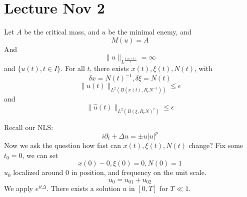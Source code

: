 \section{Lecture Nov 2}
Let $A$ be the critical mass, and $u$ be the minimal enemy, and 
\begin{equation*}
    M(u)=A
\end{equation*}
And
\begin{equation*}
    \|u\|_{L^\frac{2(n+2)}{n}}=\infty
\end{equation*}
and $\{u(t),t\in I\}$.
For all $t$, there exists $x(t), \xi(t), N(t)$, with
\begin{equation*}
    \delta x=N(t)^{-1}, \delta\xi=N(t)
\end{equation*}
\begin{equation*}
    \|u(t)\|_{L^2(B(x(t), R_\epsilon N^{-1}))}\leq\epsilon
\end{equation*}
and 
\begin{equation*}
    \|\hat{u}(t)\|_{L^2(B(\xi, R_cN)^c)}\leq\epsilon
\end{equation*}

Recall our NLS:
\begin{equation*}
    i\partial_t+\Delta u=\pm u|u|^p
\end{equation*}
Now we ask the question how fast can $x(t), \xi(t), N(t)$ change? Fix some $t_0=0$, we can set 
\begin{equation*}
    x(0)-0, \xi(0)=0, N(0)=1
\end{equation*}
$u_0$ localized around 0 in position, and frequency on the unit scale.
\begin{equation*}
    u_0=u_{01}+u_{02}
\end{equation*}
We apply $e^{it\Delta}$. There exists a solution $u$ in $[0,T]$ for $T\ll 1$.

